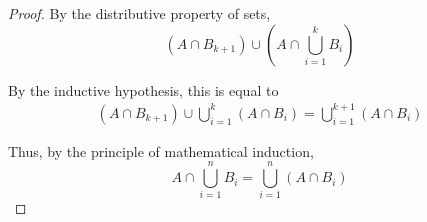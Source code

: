 \documentclass{article}
\numberwithin{subcase}{case}
\begin{document}
\begin{outline}[enumerate]
\begin{proof}
        By the distributive property of sets,
        \begin{equation}
            \left(A \cap B_{k+1}\right) \cup \left(A \cap \bigcup\limits^{k}_{i=1} B_i \right)
        \end{equation}

        By the inductive hypothesis, this is equal to
        \begin{equation}
            \begin{aligned}
                \left(A \cap B_{k+1}\right) \cup \bigcup\limits^k_{i=1} (A \cap B_i) = \bigcup\limits^{k+1}_{i=1} (A \cap B_i) 
            \end{aligned}
        \end{equation}

        Thus, by the principle of mathematical induction, 
        \begin{equation}
            A \cap \bigcup\limits^{n}_{i=1} B_i = \bigcup\limits^n_{i=1} (A \cap B_i)               
        \end{equation}

    \end{proof}

\end{outline} 
\end{document}
